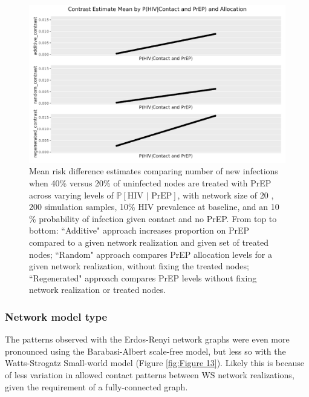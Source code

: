 \documentclass{article}
\theoremstyle{definition}
\begin{document}
\begin{figure}[H]
    \centering
    \includegraphics[width=\linewidth]{Corrected Figures/p2 Mean plots.png}
    \caption{
    Mean risk difference estimates comparing number of new infections when 40\% versus 20\% of uninfected nodes are treated with PrEP across varying levels of  $\mathbb{P}\left[\text{HIV } \vert \text{ PrEP}\right]$, with network size of 20 ,  200 simulation samples,  10\% HIV prevalence at baseline, and an 10 \% probability of infection given contact and no PrEP.
     From top to bottom: ``Additive" approach increases proportion on PrEP compared to a given network realization and given set of treated nodes; ``Random" approach compares PrEP allocation levels for a given network realization, without fixing the treated nodes; ``Regenerated" approach compares PrEP levels without fixing network realization or treated nodes.}
    \label{fig:Figure 12}

\end{figure}


\subsubsection{Network model type}
The patterns observed with the Erdos-Renyi network graphs were even more pronounced using the Barabasi-Albert scale-free model,  but less so with the Watts-Strogatz Small-world model (Figure \ref{fig:Figure 13}). Likely this is because of less variation in allowed contact patterns between WS network realizations, given the requirement of a fully-connected graph. 
\end{document}
